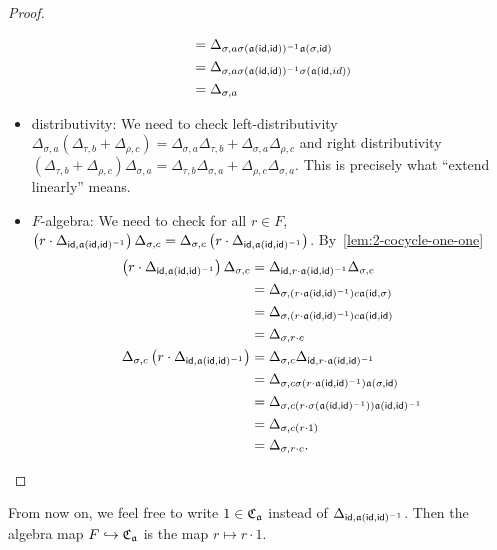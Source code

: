 \begin{proof}
\begin{itemize}
\[\begin{aligned}
            &= \Delta_{\sigma, a\sigma(\mathfrak{a}(\mathsf{id},\mathsf{id}))^{-1}\mathfrak{a}(\sigma,\mathsf{id})}\\
            &=\Delta_{\sigma, a\sigma(\mathfrak{a}(\mathsf{id},\mathsf{id}))^{-1}\sigma(\mathfrak{a}(\mathsf{id}, id))}\\
            &=\Delta_{\sigma, a}
          \end{aligned}
          \]
    \item distributivity: We need to check left-distributivity $\Delta_{\sigma, a}\left(\Delta_{\tau, b} + \Delta_{\rho, c}\right) = \Delta_{\sigma,a}\Delta_{\tau,b} + \Delta_{\sigma, a}\Delta_{\rho, c}$ and right distributivity $\left(\Delta_{\tau,b} + \Delta_{\rho,c}\right)\Delta_{\sigma,a} = \Delta_{\tau,b}\Delta_{\sigma,a} + \Delta_{\rho,c}\Delta_{\sigma,a}$. This is precisely what ``extend linearly'' means.
    \item $F$-algebra: We need to check for all $r \in F$, $\left(r\cdot \Delta_{\mathsf{id},\mathfrak{a}(\mathsf{id},\mathsf{id})^{-1}}\right)\Delta_{\sigma,c} = \Delta_{\sigma,c}\left(r\cdot\Delta_{\mathsf{id},\mathfrak{a}(\mathsf{id},\mathsf{id})^{-1}}\right)$. By~\cref{lem:2-cocycle-one-one}
          \[
          \begin{aligned}
            \left(r\cdot \Delta_{\mathsf{id},\mathfrak{a}(\mathsf{id},\mathsf{id})^{-1}}\right)\Delta_{\sigma,c}
            &= \Delta_{\mathsf{id},r\cdot\mathfrak{a}(\mathsf{id},\mathsf{id})^{-1}}\Delta_{\sigma,c}\\
            &= \Delta_{\sigma,\left(r\cdot\mathfrak{a}(\mathsf{id},\mathsf{id})^{-1}\right)c\mathfrak{a}(\mathsf{id},\sigma)} \\
            &=\Delta_{\sigma,\left(r\cdot\mathfrak{a}(\mathsf{id},\mathsf{id})^{-1}\right)c\mathfrak{a}(\mathsf{id},\mathsf{id})} \\
            &= \Delta_{\sigma, r\cdot c}\\
            \Delta_{\sigma,c}\left(r\cdot\Delta_{\mathsf{id},\mathfrak{a}(\mathsf{id},\mathsf{id})^{-1}}\right)
            &= \Delta_{\sigma,c}\Delta_{\mathsf{id},r\cdot \mathfrak{a}(\mathsf{id},\mathsf{id})^{-1}} \\
            &= \Delta_{\sigma,c\sigma\left(r\cdot\mathfrak{a}(\mathsf{id},\mathsf{id})^{-1}\right)\mathfrak{a}(\sigma,\mathsf{id})}\\
            &=\Delta_{\sigma,c\left(r\cdot\sigma\left(\mathfrak{a}(\mathsf{id},\mathsf{id})^{-1}\right)\right)\mathfrak{a}(\mathsf{id},\mathsf{id})^{-1}}\\
            &= \Delta_{\sigma, c\left(r\cdot 1\right)}\\
            &=\Delta_{\sigma,r\cdot c}.
          \end{aligned}
          \]
  \end{itemize}
\end{proof}

From now on, we feel free to write $1 \in \operatorname{\mathfrak{C}}_{\mathfrak{a}}$ instead of $\Delta_{\mathsf{id},\mathfrak{a}(\mathsf{id},\mathsf{id})^{-1}}$. Then the algebra map $F \hookrightarrow \operatorname{\mathfrak{C}}_{\mathfrak{a}}$ is the map $r \mapsto r \cdot 1$.

